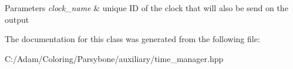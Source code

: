 \begin{DoxyParams}{Parameters}
{\em clock\-\_\-name} & unique I\-D of the clock that will also be send on the output \\
\hline
\end{DoxyParams}


The documentation for this class was generated from the following file\-:\begin{DoxyCompactItemize}
\item 
C\-:/\-Adam/\-Coloring/\-Parsybone/auxiliary/time\-\_\-manager.\-hpp\end{DoxyCompactItemize}
